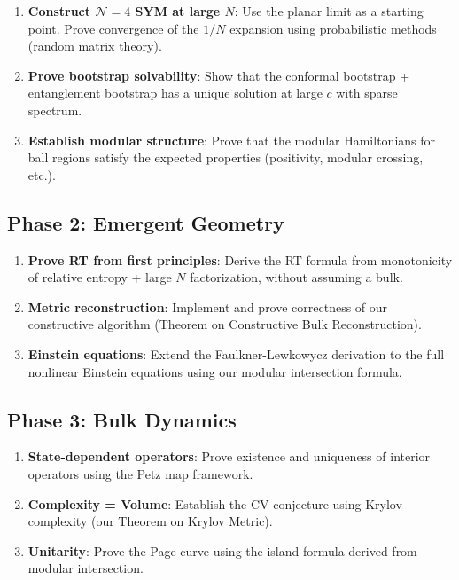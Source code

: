 \documentclass[12pt,a4paper]{article}
\begin{document}
\begin{enumerate}
    \item \textbf{Construct $\mathcal{N}=4$ SYM at large $N$}: Use the planar limit as a starting point. Prove convergence of the $1/N$ expansion using probabilistic methods (random matrix theory).
    
    \item \textbf{Prove bootstrap solvability}: Show that the conformal bootstrap + entanglement bootstrap has a unique solution at large $c$ with sparse spectrum.
    
    \item \textbf{Establish modular structure}: Prove that the modular Hamiltonians for ball regions satisfy the expected properties (positivity, modular crossing, etc.).
\end{enumerate}

\subsection{Phase 2: Emergent Geometry}

\begin{enumerate}
    \item \textbf{Prove RT from first principles}: Derive the RT formula from monotonicity of relative entropy + large $N$ factorization, without assuming a bulk.
    
    \item \textbf{Metric reconstruction}: Implement and prove correctness of our constructive algorithm (Theorem on Constructive Bulk Reconstruction).
    
    \item \textbf{Einstein equations}: Extend the Faulkner-Lewkowycz derivation to the full nonlinear Einstein equations using our modular intersection formula.
\end{enumerate}

\subsection{Phase 3: Bulk Dynamics}

\begin{enumerate}
    \item \textbf{State-dependent operators}: Prove existence and uniqueness of interior operators using the Petz map framework.
    
    \item \textbf{Complexity = Volume}: Establish the CV conjecture using Krylov complexity (our Theorem on Krylov Metric).
    
    \item \textbf{Unitarity}: Prove the Page curve using the island formula derived from modular intersection.
\end{enumerate}
\end{document}
